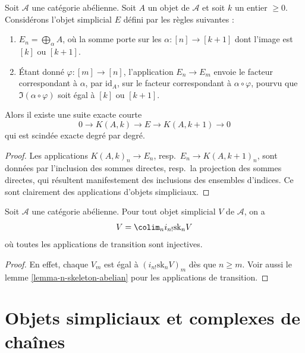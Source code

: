 \begin{lemma}
\label{lemma-extension}
Soit $\mathcal{A}$ une catégorie abélienne. Soit $A$ un objet de
$\mathcal{A}$ et soit $k$ un entier $\geq 0$. Considérons l'objet
simplicial $E$ défini par les règles suivantes :
\begin{enumerate}
\item $E_n = \bigoplus_\alpha A$, où la somme porte sur les
$\alpha : [n] \to [k + 1]$ dont l'image est $[k]$ ou $[k + 1]$.
\item Étant donné $\varphi : [m] \to [n]$, l'application
$E_n \to E_m$ envoie le facteur correspondant à $\alpha$, par
$\text{id}_A$, sur le facteur correspondant à $\alpha \circ \varphi$,
pourvu que $\Im(\alpha \circ \varphi)$ soit égal à $[k]$ ou $[k + 1]$.
\end{enumerate}
Alors il existe une suite exacte courte
$$
0 \to K(A, k) \to E \to K(A, k + 1) \to 0
$$
qui est scindée exacte degré par degré.
\end{lemma}

\begin{proof}
Les applications $K(A, k)_n \to E_n$, resp.\
$E_n \to K(A, k + 1)_n$, sont données par l'inclusion des sommes
directes, resp.\ la projection des sommes directes, qui résultent
manifestement des inclusions des ensembles d'indices. Ce sont clairement
des applications d'objets simpliciaux.
\end{proof}

\begin{lemma}
\label{lemma-abelian-limit-skeleta}
Soit $\mathcal{A}$ une catégorie abélienne. Pour tout objet simplicial
$V$ de $\mathcal{A}$, on a
$$
V = \colim_n i_{n!}\text{sk}_n V
$$
où toutes les applications de transition sont injectives.
\end{lemma}

\begin{proof}
En effet, chaque $V_m$ est égal à $(i_{n!}\text{sk}_n V)_m$ dès que
$n \geq m$. Voir aussi le lemme \ref{lemma-n-skeleton-abelian} pour les
applications de transition.
\end{proof}

\section{Objets simpliciaux et complexes de chaînes}
\label{section-complexes}

